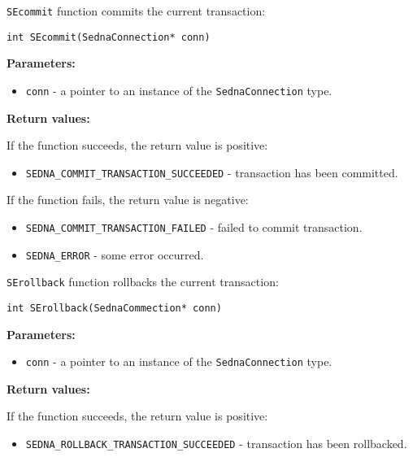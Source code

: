 \documentclass[a4paper,12pt]{article}
\newenvironment{citemize}
{\begin{itemize}
  \setlength{\itemsep}{0pt}
  \setlength{\parskip}{0pt}
  \setlength{\parsep}{0pt}}
{\end{itemize}}
\begin{document}
\verb!SEcommit! function commits the current transaction:

\begin{verbatim}
int SEcommit(SednaConnection* conn)
\end{verbatim}

\noindent
\textbf{Parameters:}

\begin{citemize}
\item\verb!conn! - a pointer to an instance of the \verb!SednaConnection! type.
\end{citemize}

\noindent
\textbf{Return values:}

\medskip

\noindent
If the function succeeds, the return value is positive:

\begin{citemize}
\item\verb!SEDNA_COMMIT_TRANSACTION_SUCCEEDED! - transaction has been committed.
\end{citemize}

\noindent
If the function fails, the return value is negative:

\begin{citemize}
\item\verb!SEDNA_COMMIT_TRANSACTION_FAILED! - failed to commit transaction.
\item\verb!SEDNA_ERROR! - some error occurred.
\end{citemize}

\verb!SErollback! function rollbacks the current transaction:

\begin{verbatim}
int SErollback(SednaCommection* conn)
\end{verbatim}

\noindent
\textbf{Parameters:}

\begin{citemize}
\item\verb!conn! - a pointer to an instance of the \verb!SednaConnection! type.
\end{citemize}

\noindent
\textbf{Return values:}

\medskip

\noindent
If the function succeeds, the return value is positive:

\begin{citemize}
\item\verb!SEDNA_ROLLBACK_TRANSACTION_SUCCEEDED! - transaction has been
rollbacked.
\end{citemize}
\end{document}
